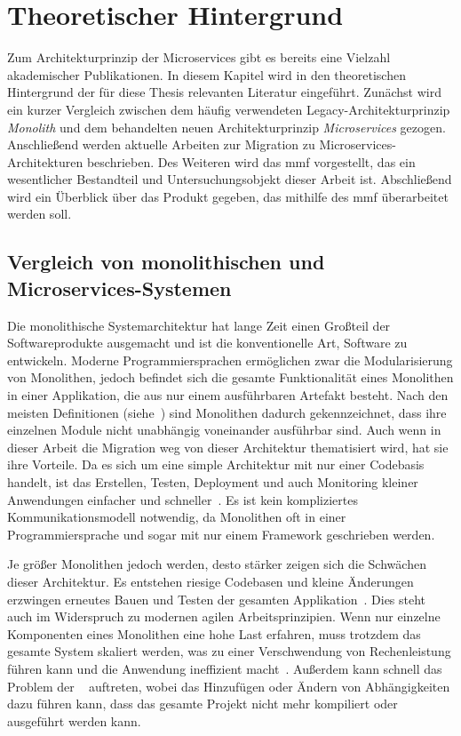 \chapter{Theoretischer Hintergrund}
\label{chap:theoretischer-hintergrund}
Zum Architekturprinzip der Microservices gibt es bereits eine Vielzahl akademischer Publikationen.
In diesem Kapitel wird in den theoretischen Hintergrund der für diese Thesis relevanten Literatur eingeführt.
Zunächst wird ein kurzer Vergleich zwischen dem häufig verwendeten Legacy-Architekturprinzip \emph{Monolith} und dem behandelten neuen Architekturprinzip \emph{Microservices} gezogen.
Anschließend werden aktuelle Arbeiten zur Migration zu Microservices-Architekturen beschrieben.
Des Weiteren wird das \acrfull{mmf} vorgestellt, das ein wesentlicher Bestandteil und Untersuchungsobjekt dieser Arbeit ist.
Abschließend wird ein Überblick über das Produkt gegeben, das mithilfe des \gls{mmf} überarbeitet werden soll.

\section{Vergleich von monolithischen und Microservices-Systemen}
\label{sec:monolith-vs-microservices}

Die monolithische Systemarchitektur hat lange Zeit einen Großteil der Softwareprodukte ausgemacht und ist die konventionelle Art, Software zu entwickeln.
Moderne Programmiersprachen ermöglichen zwar die Modularisierung von Monolithen, jedoch befindet sich die gesamte Funktionalität eines Monolithen in einer Applikation, die aus nur einem ausführbaren Artefakt besteht.
Nach den meisten Definitionen (siehe~\cite{Dragoni2017}) sind Monolithen dadurch gekennzeichnet, dass ihre einzelnen Module nicht unabhängig voneinander ausführbar sind.
Auch wenn in dieser Arbeit die Migration weg von dieser Architektur thematisiert wird, hat sie ihre Vorteile.
Da es sich um eine simple Architektur mit nur einer Codebasis handelt, ist das Erstellen, Testen, Deployment und auch Monitoring kleiner Anwendungen einfacher und schneller~\cite{a-survey-on}.
Es ist kein kompliziertes Kommunikationsmodell notwendig, da Monolithen oft in einer Programmiersprache und sogar mit nur einem Framework geschrieben werden.

Je größer Monolithen jedoch werden, desto stärker zeigen sich die Schwächen dieser Architektur.
Es entstehen riesige Codebasen und kleine Änderungen erzwingen erneutes Bauen und Testen der gesamten Applikation~\cite{Dragoni2017}.
Dies steht auch im Widerspruch zu modernen agilen Arbeitsprinzipien.
Wenn nur einzelne Komponenten eines Monolithen eine hohe Last erfahren, muss trotzdem das gesamte System skaliert werden, was zu einer Verschwendung von Rechenleistung führen kann und die Anwendung ineffizient macht~\cite{Dragoni2017}.
Außerdem kann schnell das Problem der ~\cite{Dragoni2017} auftreten, wobei das Hinzufügen oder Ändern von Abhängigkeiten dazu führen kann, dass das gesamte Projekt nicht mehr kompiliert oder ausgeführt werden kann.

